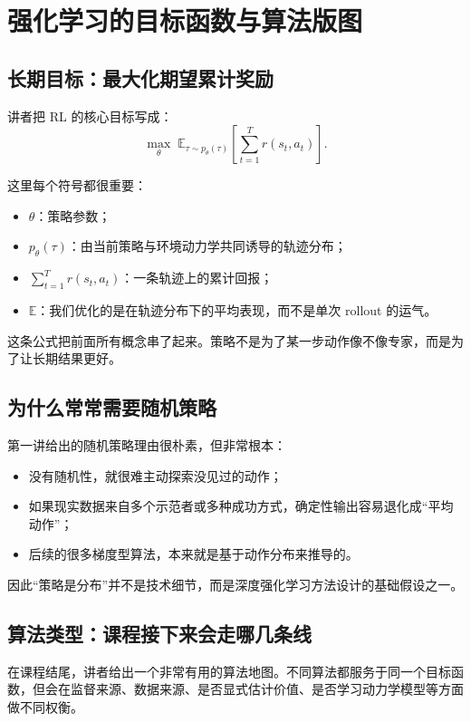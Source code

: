 \documentclass[a4paper]{article}
\begin{document}
\section{强化学习的目标函数与算法版图}

\subsection{长期目标：最大化期望累计奖励}

讲者把 RL 的核心目标写成：
\[
\max_\theta \; \mathbb{E}_{\tau\sim p_\theta(\tau)}\left[\sum_{t=1}^{T} r(s_t,a_t)\right].
\]

这里每个符号都很重要：
\begin{itemize}
\item \(\theta\)：策略参数；
\item \(p_\theta(\tau)\)：由当前策略与环境动力学共同诱导的轨迹分布；
\item \(\sum_{t=1}^{T} r(s_t,a_t)\)：一条轨迹上的累计回报；
\item \(\mathbb{E}\)：我们优化的是在轨迹分布下的平均表现，而不是单次 rollout 的运气。
\end{itemize}

这条公式把前面所有概念串了起来。策略不是为了某一步动作像不像专家，而是为了让长期结果更好。

\subsection{为什么常常需要随机策略}

第一讲给出的随机策略理由很朴素，但非常根本：
\begin{itemize}
\item 没有随机性，就很难主动探索没见过的动作；
\item 如果现实数据来自多个示范者或多种成功方式，确定性输出容易退化成“平均动作”；
\item 后续的很多梯度型算法，本来就是基于动作分布来推导的。
\end{itemize}

因此“策略是分布”并不是技术细节，而是深度强化学习方法设计的基础假设之一。

\subsection{算法类型：课程接下来会走哪几条线}

在课程结尾，讲者给出一个非常有用的算法地图。不同算法都服务于同一个目标函数，但会在监督来源、数据来源、是否显式估计价值、是否学习动力学模型等方面做不同权衡。
\end{document}
